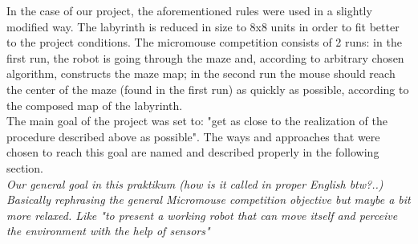  In the case of our project, the aforementioned rules were used in a slightly modified way. The labyrinth is reduced in size to 8x8 units in order to fit better to the project conditions. The micromouse competition consists of 2 runs: in the first run, the robot is going through the maze and, according to arbitrary chosen algorithm, constructs the maze map; in the second run the mouse should reach the center of the maze (found in the first run) as quickly as possible, according to the composed map of the labyrinth. \\
 The main goal of the project was set to:  "get as close to the realization of the procedure described above as possible".
 The ways and approaches that were chosen to reach this goal are named and described properly in the following section.
 \\
    \textit{Our general goal in this praktikum (how is it called in proper English btw?..)
    Basically rephrasing the general Micromouse competition objective but maybe a bit more relaxed. Like "to present a working robot that can move itself and perceive the environment with the help of sensors"}


